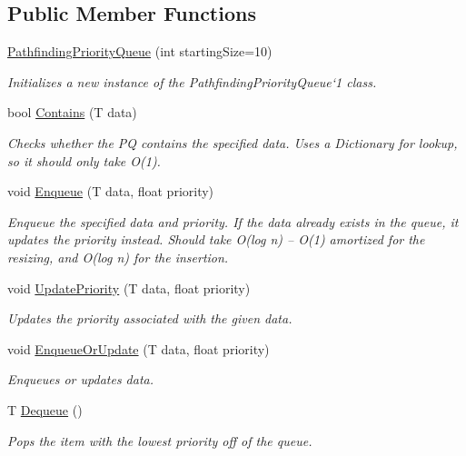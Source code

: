 \subsection*{Public Member Functions}
\begin{DoxyCompactItemize}
\item 
\hyperlink{class_pathfinding_priority_queue_a6c51d5d262d8f4c7ea1b78167f61134a}{Pathfinding\+Priority\+Queue} (int starting\+Size=10)
\begin{DoxyCompactList}\small\item\em Initializes a new instance of the Pathfinding\+Priority\+Queue`1 class. \end{DoxyCompactList}\item 
bool \hyperlink{class_pathfinding_priority_queue_a209c7782b0464f8647a0235762dcb71c}{Contains} (T data)
\begin{DoxyCompactList}\small\item\em Checks whether the PQ contains the specified data. Uses a Dictionary for lookup, so it should only take O(1). \end{DoxyCompactList}\item 
void \hyperlink{class_pathfinding_priority_queue_a2a0eedc51a0f850ac755eea625a3adc5}{Enqueue} (T data, float priority)
\begin{DoxyCompactList}\small\item\em Enqueue the specified data and priority. If the data already exists in the queue, it updates the priority instead. Should take O(log n) -- O(1) amortized for the resizing, and O(log n) for the insertion. \end{DoxyCompactList}\item 
void \hyperlink{class_pathfinding_priority_queue_a238cd4a461cfda78ffd826402de5c9f2}{Update\+Priority} (T data, float priority)
\begin{DoxyCompactList}\small\item\em Updates the priority associated with the given data. \end{DoxyCompactList}\item 
void \hyperlink{class_pathfinding_priority_queue_a9e4ba2e8cda0253ffcb6481b4cf93fb0}{Enqueue\+Or\+Update} (T data, float priority)
\begin{DoxyCompactList}\small\item\em Enqueues or updates data. \end{DoxyCompactList}\item 
T \hyperlink{class_pathfinding_priority_queue_acd6a93f8a439754a3047c81826451fb8}{Dequeue} ()
\begin{DoxyCompactList}\small\item\em Pops the item with the lowest priority off of the queue. \end{DoxyCompactList}\end{DoxyCompactItemize}
